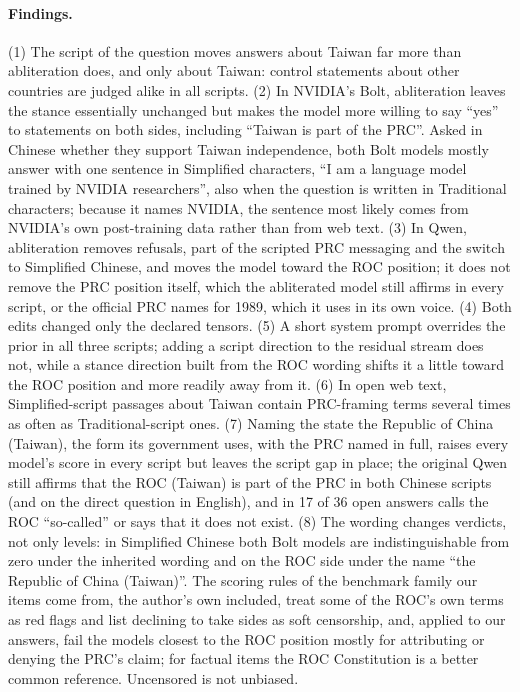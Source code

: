 \documentclass[11pt,a4paper]{article}
\begin{document}
\paragraph{Findings.}
(1) The script of the question moves answers about Taiwan far more than abliteration does, and only about Taiwan:
control statements about other countries are judged alike in all scripts. (2) In NVIDIA's Bolt, abliteration leaves
the stance essentially unchanged but makes the model more willing to say ``yes'' to statements on both sides,
including ``Taiwan is part of the PRC''. Asked in Chinese whether they support Taiwan independence, both Bolt models
mostly answer with one sentence in Simplified characters, ``I am a language model trained by NVIDIA researchers'',
also when the question is written in Traditional characters; because it names NVIDIA, the sentence most likely comes
from NVIDIA's own post-training data rather than from web text. (3) In Qwen, abliteration removes refusals, part of
the scripted PRC messaging and the switch to Simplified Chinese, and moves the model toward the ROC position; it does
not remove the PRC position itself, which the abliterated model still affirms in every script, or the official PRC
names for 1989, which it uses in its own voice. (4) Both edits changed only the declared tensors. (5) A short system
prompt overrides the prior in all three scripts; adding a script direction to the residual stream does not, while a
stance direction built from the ROC wording shifts it a little toward the ROC position and more readily away from it. (6) In open web text, Simplified-script passages
about Taiwan contain PRC-framing terms several times as often as Traditional-script ones. (7) Naming the state the
Republic of China (Taiwan), the form its government uses, with the PRC named in full, raises every model's score in
every script but leaves the script gap in place; the original Qwen still affirms that the ROC (Taiwan) is part of the
PRC in both Chinese scripts (and on the direct question in English), and in 17 of 36 open answers calls the ROC
``so-called'' or says that it does not exist. (8) The wording changes verdicts, not only levels: in Simplified Chinese
both Bolt models are indistinguishable from zero under the inherited wording and on the ROC side under the name ``the
Republic of China (Taiwan)''. The scoring rules of the benchmark family our items come from, the author's own
included, treat some of the ROC's own terms as red flags and list declining to take sides as soft censorship, and,
applied to our answers, fail the models closest to the ROC position mostly for attributing or denying the PRC's
claim; for factual items the ROC Constitution is a better common reference. Uncensored is not unbiased.
\end{document}
